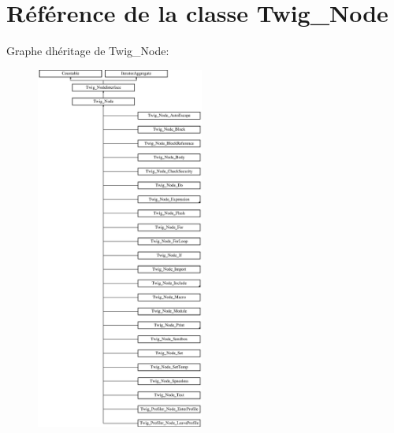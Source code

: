 \hypertarget{class_twig___node}{}\section{Référence de la classe Twig\+\_\+\+Node}
\label{class_twig___node}
Graphe d\textquotesingle{}héritage de Twig\+\_\+\+Node\+:\begin{figure}[H]
\begin{center}
\leavevmode
\includegraphics[height=12.000000cm]{class_twig___node}
\end{center}
\end{figure}
